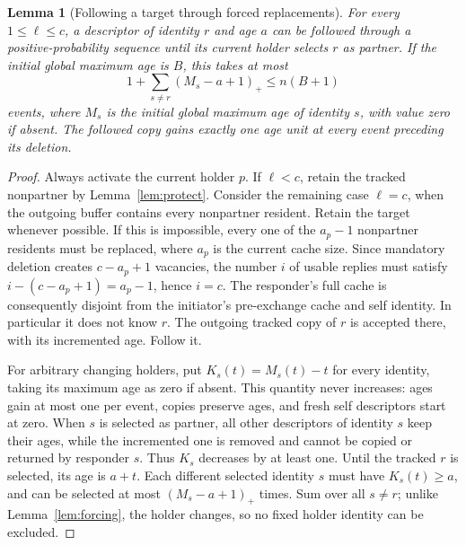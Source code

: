 \documentclass[11pt]{article}
\newtheorem{lemma}[theorem]{Lemma}
\begin{document}
\begin{lemma}[Following a target through forced replacements]
\label{lem:tracking}
For every $1\le\ell\le c$, a descriptor of identity $r$ and
age $a$ can be followed through a positive-probability sequence
until its current holder selects $r$ as partner. If the initial
global maximum age is $B$, this takes at most
\[
 1+\sum_{s\ne r}(M_s-a+1)_+\le n(B+1)
\]
events, where $M_s$ is the initial global maximum age of identity
$s$, with value zero if absent. The followed copy gains exactly
one age unit at every event preceding its deletion.
\end{lemma}
\begin{proof}
Always activate the current holder $p$.
If $\ell<c$, retain the tracked nonpartner by
Lemma~\ref{lem:protect}. Consider the remaining case $\ell=c$,
when the outgoing buffer contains every nonpartner resident.
Retain the target whenever possible. If this is impossible,
every one of the $a_p-1$ nonpartner residents must be replaced,
where $a_p$ is the current cache size. Since mandatory deletion
creates $c-a_p+1$ vacancies, the number $i$ of usable replies
must satisfy $i-(c-a_p+1)=a_p-1$, hence $i=c$.
The responder's full cache is consequently disjoint from the
initiator's pre-exchange cache and self identity.
In particular it does not know $r$. The outgoing tracked copy
of $r$ is accepted there, with its incremented age. Follow it.

For arbitrary changing holders, put $K_s(t)=M_s(t)-t$ for every
identity, taking its maximum age as zero if absent.
This quantity never increases: ages gain at most one per event,
copies preserve ages, and fresh self descriptors start at zero.
When $s$ is selected as partner, all other descriptors of identity
$s$ keep their ages, while the incremented one is removed and
cannot be copied or returned by responder $s$. Thus $K_s$
decreases by at least one.
Until the tracked $r$ is selected, its age is $a+t$.
Each different selected identity $s$ must have $K_s(t)\ge a$,
and can be selected at most $(M_s-a+1)_+$ times.
Sum over all $s\ne r$; unlike Lemma~\ref{lem:forcing}, the
holder changes, so no fixed holder identity can be excluded.
\end{proof}
\end{document}
